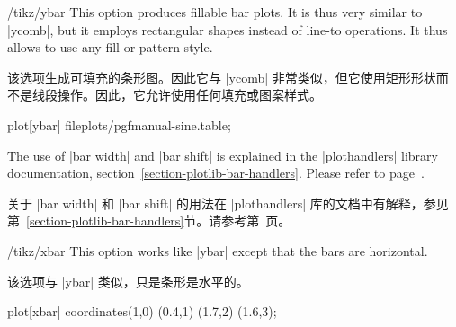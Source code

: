 \begin{key}{/tikz/ybar}
    This option produces fillable bar plots. It is thus very similar to
    |ycomb|, but it employs rectangular shapes instead of line-to operations.
    It thus allows to use any fill or pattern style.
    
    该选项生成可填充的条形图。因此它与 |ycomb| 非常类似，但它使用矩形形状而不是线段操作。因此，它允许使用任何填充或图案样式。
\begin{codeexample}[]
\tikz\draw[draw=blue,fill=blue!60!black] plot[ybar] file{plots/pgfmanual-sine.table};
\end{codeexample}

\begin{codeexample}[]
\end{codeexample}
    The use of |bar width| and |bar shift| is explained in the |plothandlers|
    library documentation, section~\ref{section-plotlib-bar-handlers}. Please
    refer to page~\pageref{key-bar-width}.

    关于 |bar width| 和 |bar shift| 的用法在 |plothandlers| 库的文档中有解释，参见第~\ref{section-plotlib-bar-handlers}节。请参考第~\pageref{key-bar-width}页。

\end{key}

\begin{key}{/tikz/xbar}
    This option works like |ybar| except that the bars are horizontal.
    
    该选项与 |ybar| 类似，只是条形是水平的。

\begin{codeexample}[preamble={\usetikzlibrary{patterns}}]
\tikz \draw[pattern=north west lines] plot[xbar]
   coordinates{(1,0) (0.4,1) (1.7,2) (1.6,3)};
\end{codeexample}
\end{key}

